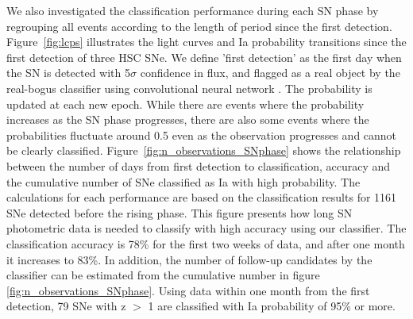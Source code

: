 \documentclass[useamsfonts]{pasj01}
\begin{document}
We also investigated the classification performance during each SN phase by regrouping all events according to the length of period since the first detection.
Figure\ \ref{fig:lcps} illustrates the light curves and Ia probability transitions since the first detection of three HSC SNe.
We define 'first detection' as the first day when the SN is detected with 5$\sigma$ confidence in flux, and flagged as a real object by the real-bogus classifier using convolutional neural network \citep{yasuda19a}.
The probability is updated at each new epoch.
While there are events where the probability increases as the SN phase progresses, there are also some events where the probabilities fluctuate around 0.5 even as the observation progresses and cannot be clearly classified.
Figure\ \ref{fig:n_observations_SNphase} shows the relationship between the number of days from first detection to classification, accuracy and the cumulative number of SNe classified as Ia with high probability.
The calculations for each performance are based on the classification results for 1161 SNe detected before the rising phase.
This figure presents how long SN photometric data is needed to classify with high accuracy using our classifier.
The classification accuracy is 78\% for the first two weeks of data, and after one month it increases to 83\%.
In addition, the number of follow-up candidates by the classifier can be estimated from the cumulative number in figure \ref{fig:n_observations_SNphase}.
Using data within one month from the first detection, 79 SNe with z $>$ 1 are classified with Ia probability of 95\% or more.
\end{document}

